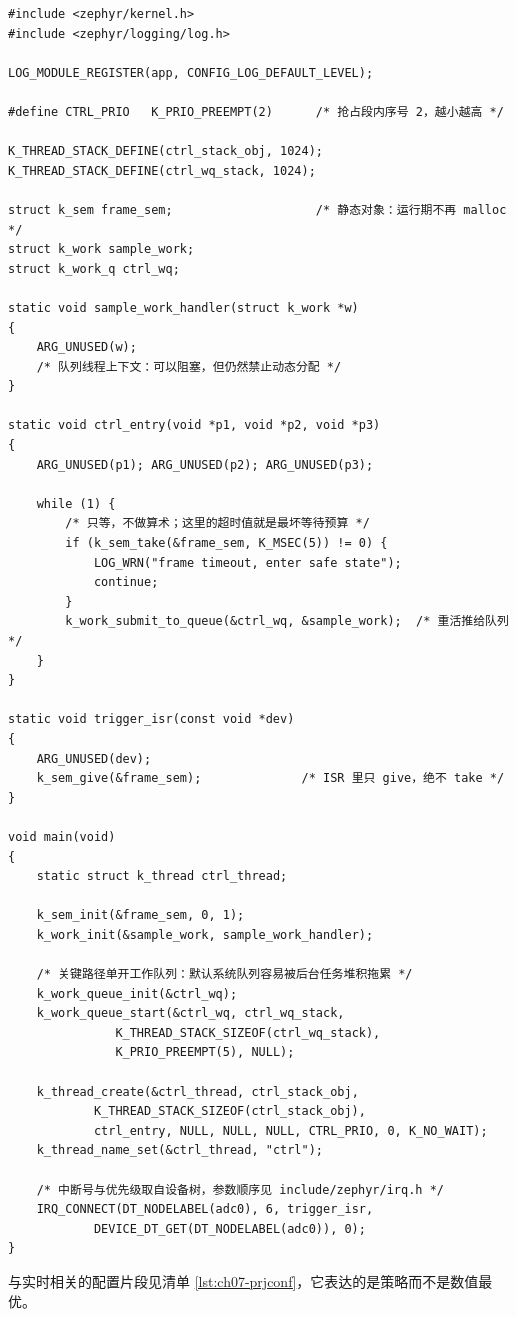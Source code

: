 \documentclass[12pt,a4paper,fontset=fandol]{ctexbook}
\begin{document}
\begin{lstlisting}[style=cstyle,caption={C：线程、信号量与专用工作队列的最小实时骨架},label={lst:ch07-thread}]
#include <zephyr/kernel.h>
#include <zephyr/logging/log.h>

LOG_MODULE_REGISTER(app, CONFIG_LOG_DEFAULT_LEVEL);

#define CTRL_PRIO   K_PRIO_PREEMPT(2)      /* 抢占段内序号 2，越小越高 */

K_THREAD_STACK_DEFINE(ctrl_stack_obj, 1024);
K_THREAD_STACK_DEFINE(ctrl_wq_stack, 1024);

struct k_sem frame_sem;                    /* 静态对象：运行期不再 malloc */
struct k_work sample_work;
struct k_work_q ctrl_wq;

static void sample_work_handler(struct k_work *w)
{
	ARG_UNUSED(w);
	/* 队列线程上下文：可以阻塞，但仍然禁止动态分配 */
}

static void ctrl_entry(void *p1, void *p2, void *p3)
{
	ARG_UNUSED(p1); ARG_UNUSED(p2); ARG_UNUSED(p3);

	while (1) {
		/* 只等，不做算术；这里的超时值就是最坏等待预算 */
		if (k_sem_take(&frame_sem, K_MSEC(5)) != 0) {
			LOG_WRN("frame timeout, enter safe state");
			continue;
		}
		k_work_submit_to_queue(&ctrl_wq, &sample_work);  /* 重活推给队列 */
	}
}

static void trigger_isr(const void *dev)
{
	ARG_UNUSED(dev);
	k_sem_give(&frame_sem);              /* ISR 里只 give，绝不 take */
}

void main(void)
{
	static struct k_thread ctrl_thread;

	k_sem_init(&frame_sem, 0, 1);
	k_work_init(&sample_work, sample_work_handler);

	/* 关键路径单开工作队列：默认系统队列容易被后台任务堆积拖累 */
	k_work_queue_init(&ctrl_wq);
	k_work_queue_start(&ctrl_wq, ctrl_wq_stack,
			   K_THREAD_STACK_SIZEOF(ctrl_wq_stack),
			   K_PRIO_PREEMPT(5), NULL);

	k_thread_create(&ctrl_thread, ctrl_stack_obj,
			K_THREAD_STACK_SIZEOF(ctrl_stack_obj),
			ctrl_entry, NULL, NULL, NULL, CTRL_PRIO, 0, K_NO_WAIT);
	k_thread_name_set(&ctrl_thread, "ctrl");

	/* 中断号与优先级取自设备树，参数顺序见 include/zephyr/irq.h */
	IRQ_CONNECT(DT_NODELABEL(adc0), 6, trigger_isr,
		    DEVICE_DT_GET(DT_NODELABEL(adc0)), 0);
}
\end{lstlisting}

与实时相关的配置片段见清单 \ref{lst:ch07-prjconf}，它表达的是策略而不是数值最优。
\end{document}
